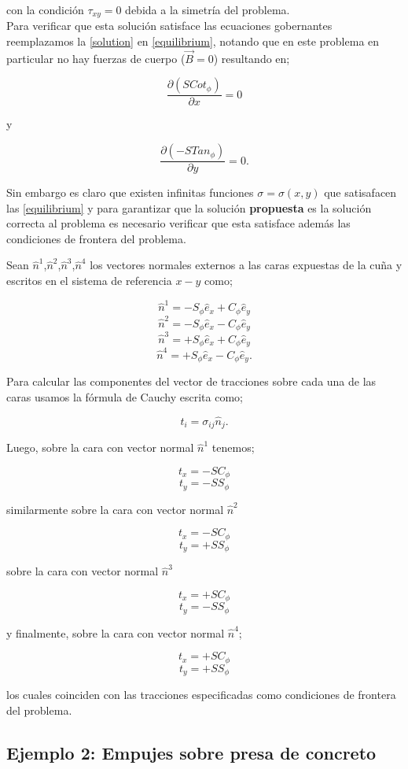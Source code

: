 \documentclass[../notas medios.tex]{subfiles}
\begin{document}
con la condición $\tau_{xy}=0$ debida a la simetría del problema.
\\
Para verificar que esta solución satisface las ecuaciones gobernantes reemplazamos la \cref{solution} en \cref{equilibrium}, notando que en este problema en particular no hay fuerzas de cuerpo ($\vec B = 0$)  resultando en;

\[\frac{{\partial (SCo{t_\phi })}}{{\partial x}} = 0\]

y

\[\frac{{\partial ( - STa{n_\phi })}}{{\partial y}} = 0.\]


Sin embargo es claro que existen infinitas funciones $\sigma  = \sigma (x,y)$  que satisafacen las \cref{equilibrium} y para garantizar que la solución {\bf propuesta} es la solución correcta al problema es necesario verificar que esta satisface además las condiciones de frontera del problema.

Sean $\hat{n}^1$,$\hat{n}^2$,$\hat{n}^3$,$\hat{n}^4$ los vectores normales externos a las caras expuestas de la cuña y escritos en el sistema de referencia $x-y$ como;

\[\hat{n}^1=-S_{\phi}\hat{e}_{x}+C_{\phi}\hat{e}_{y}\]
\[\hat{n}^2=-S_{\phi}\hat{e}_{x}-C_{\phi}\hat{e}_{y}\]
\[\hat{n}^3=+S_{\phi}\hat{e}_{x}+C_{\phi}\hat{e}_{y}\]
\[\hat{n}^4=+S_{\phi}\hat{e}_{x}-C_{\phi}\hat{e}_{y}.\]


Para calcular las componentes del vector de tracciones sobre cada una de las caras usamos la fórmula de Cauchy escrita como;

\[t_{i}=\sigma_{ij}\hat{n}_{j}.\]

Luego, sobre la cara con vector normal $\hat{n}^1$ tenemos;

\[t_{x}=-SC_{\phi}\]
\[t_{y}=-SS_{\phi}\]

similarmente sobre la cara con vector normal $\hat{n}^2$

\[t_{x}=-SC_{\phi}\]
\[t_{y}=+SS_{\phi}\]

sobre la cara con vector normal $\hat{n}^3$ 

\[t_{x}=+SC_{\phi}\]
\[t_{y}=-SS_{\phi}\]

y finalmente, sobre la cara con vector normal $\hat{n}^4$;

\[t_{x}=+SC_{\phi}\]
\[t_{y}=+SS_{\phi}\]

los cuales coinciden con las tracciones especificadas como condiciones de frontera del problema.


\subsection*{Ejemplo 2: Empujes sobre presa de concreto}
\end{document}
